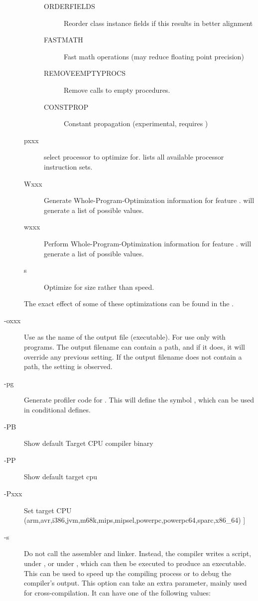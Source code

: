 \begin{description}
\begin{description}
\begin{description}
\item[ORDERFIELDS] Reorder class instance fields if this results in better alignment
\item[FASTMATH] Fast math operations (may reduce floating point precision)
\item[REMOVEEMPTYPROCS] Remove calls to empty procedures.
\item[CONSTPROP] Constant propagation (experimental, requires )
\end{description}
\item[pxxx] select processor  to optimize for.  lists
all available processor instruction sets.
\item[Wxxx] Generate Whole-Program-Optimization information for feature .
 will generate a list of possible values.
\item[wxxx] Perform  Whole-Program-Optimization information for feature
.  will generate a list of possible values.
\item[s] Optimize for size rather than speed.
\end{description}
The exact effect of some of these optimizations can be found in the \progref.
\item [-oxxx]  Use  as the name of the output
file (executable). For use only with programs. The output filename can contain a
path, and if it does, it will override any previous  setting. If
the output filename does not contain a path, the  setting is
observed.
\item [-pg]  Generate profiler code for . This will
define the symbol , which can be used in conditional
defines.
\item[-PB]        Show default Target CPU compiler binary
\item[-PP]        Show default target cpu
\item[-Pxxx]      Set target CPU (arm,avr,i386,jvm,m68k,mips,mipsel,powerpc,powerpc64,sparc,x86\_64)
]
\item [-s]  Do not call the assembler and linker.
Instead, the compiler writes a script,  under \dos, or
 under \linux, which can then be executed to produce an
executable. This can be used to speed up the compiling process or to debug
the compiler's output. This option can take an extra parameter, mainly
used for cross-compilation. It can have one of the following values:
\begin{description}

\end{description}
\end{description}
